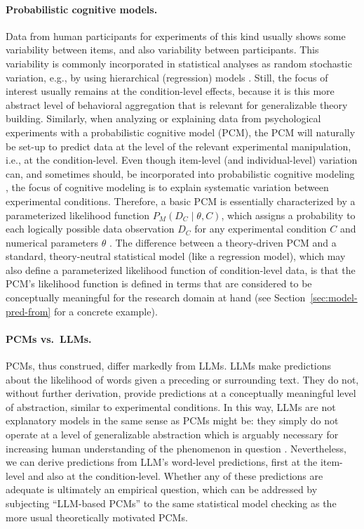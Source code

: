 \documentclass[fleqn]{article}
\begin{document}
\paragraph{Probabilistic cognitive models.}
Data from human participants for experiments of this kind usually shows some variability between items, and also variability between participants.
This variability is commonly incorporated in statistical analyses as random stochastic variation, e.g., by using hierarchical (regression) models \citep{Jaeger2008:Categorical-dat,barr2013,SorensenHohensteinb2016:Bayesian-linear}.
Still, the focus of interest usually remains at the condition-level effects, because it is this more abstract level of behavioral aggregation that is relevant for generalizable theory building.
Similarly, when analyzing or explaining data from psychological experiments with a probabilistic cognitive model (PCM), the PCM will naturally be set-up to predict data at the level of the relevant experimental manipulation, i.e., at the condition-level.
Even though item-level (and individual-level) variation can, and sometimes should, be incorporated into probabilistic cognitive modeling \citep[e.g.,][]{NilsonRieskamp2011:Hierarchical-Ba,Lee2011:How-Cognitive-M,ScheibehenneRieskamp2013:Testing-the-Ada}, the focus of cognitive modeling is to explain systematic variation between experimental conditions.
Therefore, a basic PCM is essentially characterized by a parameterized likelihood function $P_{M}(D_{C} \mid \theta, C)$, which assigns a probability to each logically possible data observation $D_{C}$ for any experimental condition $C$ and numerical parameters $\theta$ \citep{LewandowskyFarrell2011:Computational-M,LeeWagenmakers2013:Bayesian-Cognit}.
The difference between a theory-driven PCM and a standard, theory-neutral statistical model (like a regression model), which may also define a parameterized likelihood function of condition-level data, is that the PCM's likelihood function is defined in terms that are considered to be conceptually meaningful for the research domain at hand (see Section~\ref{sec:model-pred-from} for a concrete example).

\paragraph{PCMs vs.~LLMs.}
PCMs, thus construed, differ markedly from LLMs.
LLMs make predictions about the likelihood of words given a preceding or surrounding text.
They do not, without further derivation, provide predictions at a conceptually meaningful level of abstraction, similar to experimental conditions.
In this way, LLMs are not explanatory models in the same sense as PCMs might be: they simply do not operate at a level of generalizable abstraction which is arguably necessary for increasing human understanding of the phenomenon in question \citep{Dellsen2020:Beyond-Explanat,Grimm2021:Understanding}.
Nevertheless, we can derive predictions from LLM's word-level predictions, first at the item-level and also at the condition-level.
Whether any of these predictions are adequate is ultimately an empirical question, which can be addressed by subjecting ``LLM-based PCMs'' to the same statistical model checking as the more usual theoretically motivated PCMs.
\end{document}
